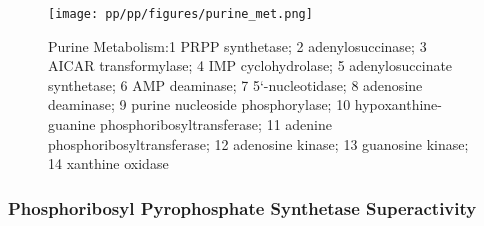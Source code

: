 \documentclass{scrartcl}
\begin{document}
\begin{figure}[htbp]
\centering
\texttt{[image: pp/pp/figures/purine\_met.png]}
\caption{\label{fig:org0e443bf}Purine Metabolism:1 PRPP synthetase; 2 adenylosuccinase; 3 AICAR transformylase; 4 IMP cyclohydrolase; 5 adenylosuccinate synthetase; 6 AMP deaminase; 7 5‘-nucleotidase; 8 adenosine deaminase; 9 purine nucleoside phosphorylase; 10 hypoxanthine-guanine phosphoribosyltransferase; 11 adenine phosphoribosyltransferase; 12 adenosine kinase; 13 guanosine kinase; 14 xanthine oxidase}
\end{figure}

\subsubsection{Phosphoribosyl Pyrophosphate Synthetase Superactivity}
\label{sec:org0f827a7}
\end{document}
